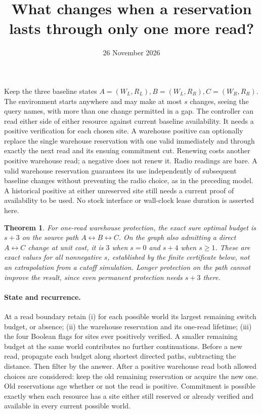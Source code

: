 \documentclass[11pt]{article}
\title{What changes when a reservation lasts through only one more read?}
\author{}
\date{26 November 2026}
\newtheorem{theorem}{Theorem}
\begin{document}
\maketitle

Keep the three baseline states $A=(W_L,R_L),B=(W_L,R_R),C=(W_R,R_R)$. The environment starts anywhere and may make at most $s$ changes, seeing the query names, with more than one change permitted in a gap. The controller can read either side of either resource against current baseline availability. It needs a positive verification for each chosen site. A warehouse positive can optionally replace the single warehouse reservation with one valid immediately and through exactly the next read and its ensuing commitment cut. Renewing costs another positive warehouse read; a negative does not renew it. Radio readings are bare. A valid warehouse reservation guarantees its use independently of subsequent baseline changes without preventing the radio choice, as in the preceding model. A historical positive at either unreserved site still needs a current proof of availability to be used. No stock interface or wall-clock lease duration is asserted here.

\begin{theorem}
For one-read warehouse protection, the exact sure optimal budget is $s+3$ on the source path $A\leftrightarrow B\leftrightarrow C$. On the graph also admitting a direct $A\leftrightarrow C$ change at unit cost, it is $3$ when $s=0$ and $s+4$ when $s\ge1$. These are exact values for all nonnegative $s$, established by the finite certificate below, not an extrapolation from a cutoff simulation. Longer protection on the path cannot improve the result, since even permanent protection needs $s+3$ there.
\end{theorem}

\paragraph{State and recurrence.}
At a read boundary retain (i) for each possible world its largest remaining switch budget, or absence; (ii) the warehouse reservation and its one-read lifetime; (iii) the four Boolean flags for sites ever positively verified. A smaller remaining budget at the same world contributes no further continuations. Before a new read, propagate each budget along shortest directed paths, subtracting the distance. Then filter by the answer. After a positive warehouse read both allowed choices are considered: keep the old remaining reservation or acquire the new one. Old reservations age whether or not the read is positive. Commitment is possible exactly when each resource has a site either still reserved or already verified and available in every current possible world.
\end{document}
